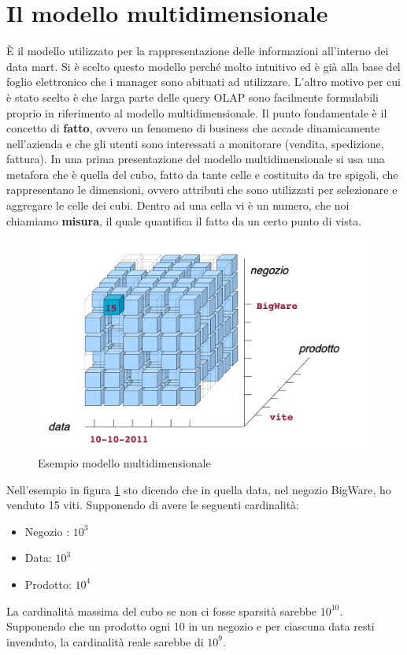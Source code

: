 \section{Il modello multidimensionale}

È il modello utilizzato per la rappresentazione delle informazioni all’interno dei data mart. Si è scelto questo modello perché molto intuitivo ed è già alla base del foglio elettronico che i manager sono abituati ad utilizzare. L’altro motivo per cui è stato  scelto è che larga parte delle query OLAP sono facilmente formulabili proprio in riferimento al modello multidimensionale. Il punto fondamentale è il concetto di \textbf{fatto}, ovvero un fenomeno di business che accade dinamicamente nell’azienda e che gli utenti sono interessati a monitorare (vendita, spedizione, fattura). In una prima presentazione del modello multidimensionale si usa una metafora che è quella del cubo, fatto da tante celle e costituito da tre spigoli, che rappresentano le dimensioni, ovvero attributi che sono utilizzati per selezionare e aggregare le celle dei cubi. Dentro ad una cella vi è un numero, che noi chiamiamo \textbf{misura}, il quale quantifica il fatto da un certo punto di vista. 
\begin{figure}[H]
	\centering
	\includegraphics[width=0.7\linewidth]{img/example}
	\caption{Esempio modello multidimensionale}
	\label{fig:model}
\end{figure}
Nell'esempio in figura \ref{fig:model} sto dicendo che in quella data, nel negozio BigWare, ho venduto 15 viti. Supponendo di avere le seguenti cardinalità:
\begin{itemize}
	\item 
	Negozio : $10^{3}$
	\item 
	Data: $10^{3}$
	\item 
	Prodotto: $10^{4}$
\end{itemize}
La cardinalità massima del cubo se non ci fosse sparsità sarebbe $10^{10}$. Supponendo che un prodotto ogni 10 in un negozio e per ciascuna data resti invenduto, la cardinalità reale sarebbe di $10^{9}$. \\

